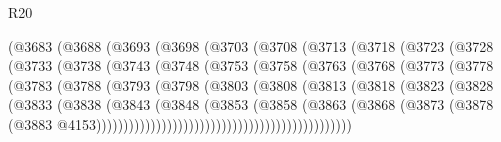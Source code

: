 \begin{lexlean}{R20}
\begin{coremodule}
{                (@3683
                  (@3688
                    (@3693
                      (@3698
                        (@3703
                          (@3708
                            (@3713
                              (@3718
                                (@3723
                                  (@3728
                                    (@3733
                                      (@3738
                                        (@3743
                                          (@3748
                                            (@3753
                                              (@3758
                                                (@3763
                                                  (@3768
                                                    (@3773
                                                      (@3778
                                                        (@3783
                                                          (@3788
                                                            (@3793
                                                              (@3798
                                                                (@3803
                                                                  (@3808
                                                                    (@3813
                                                                      (@3818
                                                                        (@3823
                                                                          (@3828
                                                                            (@3833
                                                                              (@3838
                                                                                (@3843
                                                                                  (@3848
                                                                                    (@3853
                                                                                      (@3858
                                                                                        (@3863
                                                                                          (@3868
                                                                                            (@3873
                                                                                              (@3878
                                                                                                (@3883
                                                                                                  @4153)))))))))))))))))))))))))))))))))))))))))))))))
}
\end{coremodule}
\end{lexlean}
